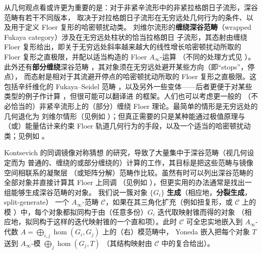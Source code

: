 \documentclass[UTF8,a4paper,11pt,fontset=windows]{ctexart}
\theoremstyle{cnthm}
\numberwithin{equation}{section}
\begin{document}
从几何观点看或许更为重要的是：对于非紧辛流形中的非紧拉格朗日子流形，深谷范畴有若干不同版本，
取决于对拉格朗日子流形在无穷远处几何行为的条件、以及用于定义 Floer 复形的哈密顿扰动类。
刘维尔流形的\textbf{缠绕深谷范畴}（wrapped Fukaya category）涉及在无穷远处柱状的恰当拉格朗日
子流形，其态射由缠绕 Floer 复形给出，即关于无穷远处斜率越来越大的线性增长哈密顿扰动所取的
Floer 复形之直极限，并配以适当构造的 Floer $A_\infty$-运算
（不同的处理方式见 \cite{r1,r12,r56}）。此外还有\textbf{部分缠绕}深谷范畴
\cite{r98,r56,r57}，其对象须在无穷远处避开某些方向（即“stops”，停点），
而态射是相对于其流避开停点的哈密顿扰动所取的 Floer 复形之直极限。这包括辛纤维化的
Fukaya--Seidel 范畴 \cite{r92,r93}，以及另外一些变体——后者更便于对某些类型的例子作计算
\cite{r21,r61,r6}，但很可能可以翻译进 \cite{r56,r57} 的框架。人们也可以考虑更一般的
（不必恰当的）非紧辛流形上的（部分）缠绕 Floer 理论。最简单的情形是无穷远处的几何退化为
刘维尔情形（见例如 \cite{r89}）；但真正需要的只是某种能通过极值原理与（或）能量估计来约束
Floer 轨道几何行为的手段，以及一个适当的哈密顿扰动类；见例如 \cite[第 3 节]{r6}。


Kontsevich 的同调镜像对称猜想 \cite{r65} 的研究，导致了大量集中于深谷范畴（视几何设定而为
普通的、缠绕的或部分缠绕的）计算的工作，其目标是把这些范畴与镜像空间相联系的凝聚层
（或矩阵分解）范畴作比较。虽然有时可以列出深谷范畴的全部对象并直接计算其 Floer 上同调
（见例如 \cite{r85}），但更实用的办法通常是找出一组能够生成深谷范畴的对象。
我们说一簇对象 $\{G_i\}$ \textbf{生成}（相应地，\textbf{分裂生成}，split-generate）
一个 $A_\infty$-范畴 $\mathcal{C}$，如果在其三角化扩充（例如扭复形，或 $\mathcal{C}$ 上的模
\cite{r92}）中，每个对象都拟同构于由（任意多份）$G_i$ 迭代取映射锥而得的对象
（相应地，拟同构于这样的迭代映射锥的一个直和项）。此时 $\mathcal{C}$ 可全忠实地嵌入到
$A_\infty$-代数 $A=\bigoplus_{i,j}\hom(G_i,G_j)$ 上的（右）模范畴中，
Yoneda 嵌入把每个对象 $T$ 送到 $A_\infty$-模 $\bigoplus_j\hom(G_j,T)$
（其结构映射由 $\mathcal{C}$ 中的复合给出）。
\end{document}

